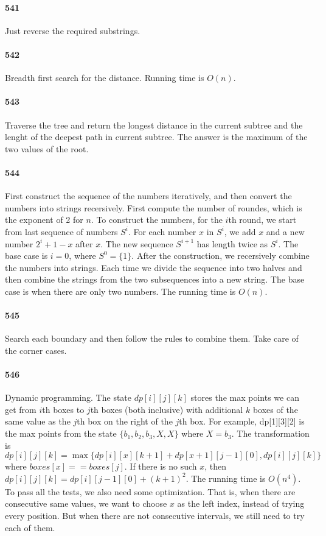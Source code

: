 \documentclass[11pt]{article}
\begin{document}
\paragraph{541}
Just reverse the required substrings.

\paragraph{542}
Breadth first search for the distance. Running time is $O(n)$.

\paragraph{543}
Traverse the tree and return the longest distance in the current subtree and the lenght of the deepest path in current subtree. The answer is the maximum of the two values of the root.

\paragraph{544}
First construct the sequence of the numbers iteratively, and then convert the numbers into strings recersively.
First compute the number of roundes, which is the exponent of 2 for $n$. To construct the numbers, for the $i$th round, we start from last sequence of numbers $S^i$. For each number $x$ in $S^i$, we add $x$ and a new number $2^i+1 - x$ after $x$.
The new sequence $S^{i+1}$ has length twice as $S^i$. The base case is $i = 0$, where $S^0 = \{ 1 \}$.
After the construction, we recersively combine the numbers into strings. Each time we divide the sequence into two halves 
and then combine the strings from the two subsequences into a new string. The base case is when there are only two numbers.
The running time is $O(n)$.

\paragraph{545}
Search each boundary and then follow the rules to combine them. Take care of the corner cases.

\paragraph{546}
Dynamic programming. The state $dp[i][j][k]$ stores the max points we can get from $i$th boxes to $j$th boxes (both inclusive) 
with additional $k$ boxes of the same value as the $j$th box on the right of the $j$th box. For example, dp[1][3][2] 
is the max points from the state $\{b_1, b_2, b_3, X, X \}$ where $X = b_3$. 
The transformation is $dp[i][j][k] = \max \{dp[i][x][k+1] + dp[x+1][j-1][0], dp[i][j][k] \}$ where $boxes[x] == boxes[j]$.
If there is no such $x$, then $dp[i][j][k] = dp[i][j-1][0] + (k+1)^2$.
The running time is $O(n^4)$. 
To pass all the tests, we also need some optimization. That is, when there are consecutive same values, we want to choose $x$
as the left index, instead of trying every position. But when there are not consecutive intervals, we still need to try each 
of them.
\end{document}
